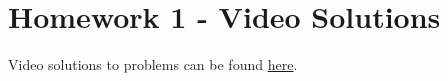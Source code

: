 %
%
%
%
%
%
%

\section{Homework 1 - Video Solutions}
Video solutions to problems can be found \href{http://signalsandsystems.wikidot.com/problems}{here}.



%
